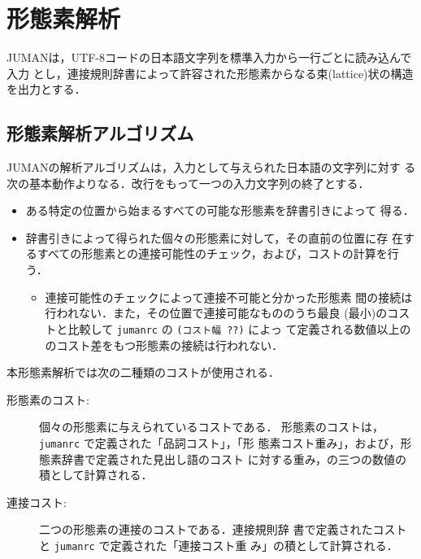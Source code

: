 \documentclass[a4j,titlepage]{jarticle}
\begin{document}
\section{形態素解析}\label{kaiseki}

JUMANは，UTF-8コードの日本語文字列を標準入力から一行ごとに読み込んで入力
とし，連接規則辞書によって許容された形態素からなる束(lattice)状の構造
を出力とする．

\subsection{形態素解析アルゴリズム}

JUMANの解析アルゴリズムは，入力として与えられた日本語の文字列に対す
る次の基本動作よりなる．改行をもって一つの入力文字列の終了とする．

\begin{itemize}
\item ある特定の位置から始まるすべての可能な形態素を辞書引きによって
得る．
\item 辞書引きによって得られた個々の形態素に対して，その直前の位置に存
在するすべての形態素との連接可能性のチェック，および，コストの計算を行
う．
  \begin{itemize}
    \item 連接可能性のチェックによって連接不可能と分かった形態素
間の接続は行われない．また，その位置で連接可能なもののうち最良
(最小)のコストと比較して {\tt jumanrc} の {\tt (コスト幅 ??)} によっ
て定義される数値以上ののコスト差をもつ形態素の接続は行われない．
  \end{itemize}
\end{itemize}

\noindent
本形態素解析では次の二種類のコストが使用される．

\begin{description}
  \item [形態素のコスト:] 個々の形態素に与えられているコストである．
形態素のコストは，{\tt jumanrc} で定義された「品詞コスト」，「形
態素コスト重み」，および，形態素辞書で定義された見出し語のコスト
に対する重み，の三つの数値の積として計算される．
  \item [連接コスト:] 二つの形態素の連接のコストである．連接規則辞
書で定義されたコストと {\tt jumanrc} で定義された「連接コスト重
み」の積として計算される．
\end{description}
\end{document}
